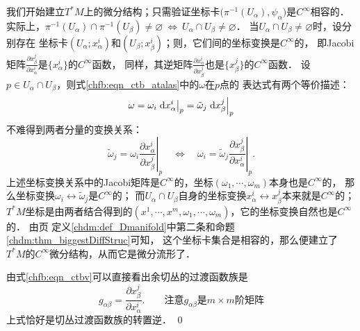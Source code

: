 我们开始建立$T^*M$上的微分结构；只需验证坐标卡$\bigl(\pi^{-1} (U_\alpha),\psi_\alpha\bigr)$是$C^\infty$相容的．
实际上，$\pi^{-1} (U_\alpha) \cap \pi^{-1} (U_\beta) \neq \varnothing \ \Leftrightarrow\ 
U_\alpha \cap U_\beta \neq \varnothing$．
当$U_\alpha \cap U_\beta \neq \varnothing$时，设分别存在
坐标卡$(U_\alpha;x^i_\alpha)$和$(U_\beta;x^i_\beta)$；则，它们间的坐标变换是$C^\infty$的，
即Jacobi矩阵$\frac{\partial {x}^j_\beta}{\partial {x}^i_\alpha}$是$\{x^i_\alpha\}$的$C^\infty$函数，
同样，其逆矩阵$\frac{\partial {x}^i_\alpha}{\partial {x}^j_\beta}$也是$\{{x}^j_\beta\}$的$C^\infty$函数．
设$p \in U_\alpha \cap U_\beta$，则式\eqref{chfb:eqn_ctb_atalas}中的$\omega$在$p$点的
表达式有两个等价描述：
\begin{equation*}
    \omega = \omega_i \left. {\rm d}x^i_\alpha \right | _p
    = \tilde{\omega}_j \left. {\rm d}x^j_\beta \right | _p
\end{equation*}
不难得到两者分量的变换关系：
\begin{equation}\label{chfb:eqn_ctbv}
    \tilde{\omega}_j = \omega_i \left. \frac{\partial {x}^i_\alpha}{\partial {x}^j_\beta}  \right | _p
    {\quad \Leftrightarrow \quad}
    \omega_i  = \tilde{\omega}_j \left. \frac{\partial {x}^j_\beta}{\partial {x}^i_\alpha}  \right | _p .
\end{equation}
上述坐标变换关系中的Jacobi矩阵是$C^\infty$的，坐标$(\omega_1,\cdots,\omega_m)$本身也是$C^\infty$的，
那么坐标变换$\omega_i \leftrightarrow \tilde{\omega}_j$是$C^\infty$的；
而$U_\alpha \cap U_\beta$自身的坐标变换$x^i_\alpha \leftrightarrow {x}^j_\beta$本来就是$C^\infty$的；
$T^*M$坐标是由两者结合得到的$(x^1,\cdots,x^m,\omega_1,\cdots,\omega_m)$，它的坐标变换自然也是$C^\infty$的．
由\pageref{chdm:def_Dmanifold}页
定义\ref{chdm:def_Dmanifold}中第二条和命题\ref{chdm:thm_biggestDiffStruc}可知，
这个坐标卡集合是{\kaishu 相容的}，那么便建立了$T^*M$的$C^\infty$微分结构，从而它是微分流形了．

由式\eqref{chfb:eqn_ctbv}可以直接看出余切丛的过渡函数族是
\begin{equation}
    g_{\alpha\beta} = \frac{\partial {x}^j_\beta}{\partial {x}^i_\alpha}  .
    \qquad \text{注意}g_{\alpha\beta}\text{是} m\times m \text{阶矩阵}
\end{equation}
上式恰好是切丛过渡函数族的转置逆．
\qed

